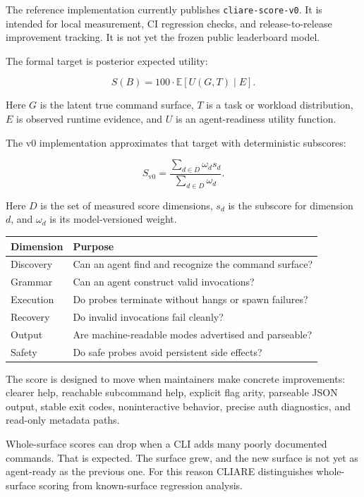 \documentclass[11pt]{article}
\begin{document}
The reference implementation currently publishes \texttt{cliare-score-v0}. It is intended for local measurement, CI regression checks, and release-to-release improvement tracking. It is not yet the frozen public leaderboard model.

The formal target is posterior expected utility:

\[
S(B) = 100 \cdot \mathbb{E}[U(G, T) \mid E].
\]

Here \(G\) is the latent true command surface, \(T\) is a task or workload distribution, \(E\) is observed runtime evidence, and \(U\) is an agent-readiness utility function.

The v0 implementation approximates that target with deterministic subscores:

\[
S_{\mathrm{v0}}
  =
  \frac{\sum_{d \in D} \omega_d s_d}
       {\sum_{d \in D} \omega_d}.
\]

Here \(D\) is the set of measured score dimensions, \(s_d\) is the subscore for dimension \(d\), and \(\omega_d\) is its model-versioned weight.

\begin{table}[h]
\centering
\begin{tabularx}{\textwidth}{@{}lX@{}}
\toprule
Dimension & Purpose \\
\midrule
Discovery & Can an agent find and recognize the command surface? \\
Grammar & Can an agent construct valid invocations? \\
Execution & Do probes terminate without hangs or spawn failures? \\
Recovery & Do invalid invocations fail cleanly? \\
Output & Are machine-readable modes advertised and parseable? \\
Safety & Do safe probes avoid persistent side effects? \\
\bottomrule
\end{tabularx}
\end{table}

The score is designed to move when maintainers make concrete improvements: clearer help, reachable subcommand help, explicit flag arity, parseable JSON output, stable exit codes, noninteractive behavior, precise auth diagnostics, and read-only metadata paths.

Whole-surface scores can drop when a CLI adds many poorly documented commands. That is expected. The surface grew, and the new surface is not yet as agent-ready as the previous one. For this reason CLIARE distinguishes whole-surface scoring from known-surface regression analysis.
\end{document}
